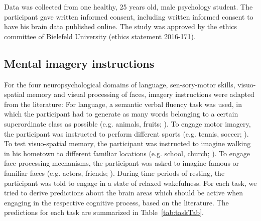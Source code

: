\documentclass[fleqn,10pt]{SelfArx} %
\begin{document}
Data was collected from one healthy, 25 years old, male psychology student. The participant gave written informed consent, including written informed consent to have his brain data published online. The study was approved by the ethics committee of Bielefeld University (ethics statement 2016-171).

\subsection{Mental imagery instructions}

For the four neuropsychological domains of language, sen-sory-motor skills, visuo-spatial memory and visual processing of faces, imagery instructions were adapted from the literature: For language, a semantic verbal fluency task was used, in which the participant had to generate as many words belonging to a certain superordinate class as possible (e.g. animals, fruits; \citet{Woermann_2003}). To engage motor imagery, the participant was instructed to perform different sports (e.g. tennis, soccer; \citet{Owen_2006}). To test visuo-spatial memory, the participant was instructed to imagine walking in his hometown to different familiar locations (e.g. school, church; \citet{Jokeit_2001}). To engage face processing mechanisms, the participant was asked to imagine famous or familiar faces (e.g. actors, friends; \citet{O_Craven_2000}). During time periods of resting, the participant was told to engage in a state of relaxed wakefulness. For each task, we tried to derive predictions about the brain areas which should be active when engaging in the respective cognitive process, based on the literature. The predictions for each task are summarized in Table~\ref{tab:taskTab}.

\renewcommand{\arraystretch}{1.5}
\end{document}
